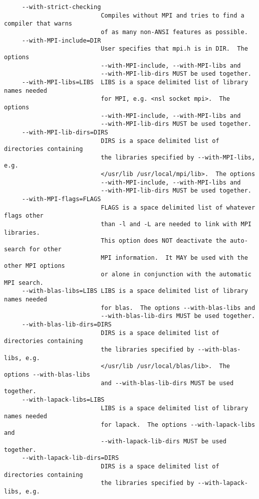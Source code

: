 \begin{verbatim}
     --with-strict-checking 
                           Compiles without MPI and tries to find a compiler that warns
                           of as many non-ANSI features as possible.
     --with-MPI-include=DIR 
                           User specifies that mpi.h is in DIR.  The options
                           --with-MPI-include, --with-MPI-libs and 
                           --with-MPI-lib-dirs MUST be used together.
     --with-MPI-libs=LIBS  LIBS is a space delimited list of library names needed 
                           for MPI, e.g. <nsl socket mpi>.  The options
                           --with-MPI-include, --with-MPI-libs and 
                           --with-MPI-lib-dirs MUST be used together.
     --with-MPI-lib-dirs=DIRS
                           DIRS is a space delimited list of directories containing 
                           the libraries specified by --with-MPI-libs, e.g.
                           </usr/lib /usr/local/mpi/lib>.  The options
                           --with-MPI-include, --with-MPI-libs and 
                           --with-MPI-lib-dirs MUST be used together.
     --with-MPI-flags=FLAGS
                           FLAGS is a space delimited list of whatever flags other 
                           than -l and -L are needed to link with MPI libraries. 
                           This option does NOT deactivate the auto-search for other
                           MPI information.  It MAY be used with the other MPI options 
                           or alone in conjunction with the automatic MPI search.
     --with-blas-libs=LIBS LIBS is a space delimited list of library names needed 
                           for blas.  The options --with-blas-libs and 
                           --with-blas-lib-dirs MUST be used together.
     --with-blas-lib-dirs=DIRS
                           DIRS is a space delimited list of directories containing 
                           the libraries specified by --with-blas-libs, e.g.
                           </usr/lib /usr/local/blas/lib>.  The options --with-blas-libs
                           and --with-blas-lib-dirs MUST be used together.
     --with-lapack-libs=LIBS
                           LIBS is a space delimited list of library names needed 
                           for lapack.  The options --with-lapack-libs and 
                           --with-lapack-lib-dirs MUST be used together.
     --with-lapack-lib-dirs=DIRS
                           DIRS is a space delimited list of directories containing 
                           the libraries specified by --with-lapack-libs, e.g.

\end{verbatim}
